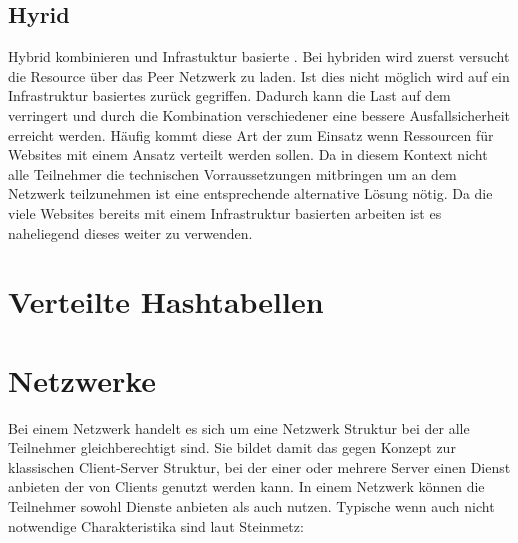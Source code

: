 \subsection{Hyrid \cdns}
Hybrid \cdns kombinieren \pTp \cdns und Infrastuktur basierte \cdns. Bei hybriden \cdns wird zuerst versucht die Resource über das Peer Netzwerk zu laden. Ist dies nicht möglich wird auf ein Infrastruktur basiertes \cdn zurück gegriffen. Dadurch kann die Last auf dem \cdn verringert und durch die Kombination verschiedener \cdns eine bessere Ausfallsicherheit erreicht werden. Häufig kommt diese Art der \cdns zum Einsatz wenn Ressourcen für Websites mit einem \pTp Ansatz verteilt werden sollen. Da in diesem Kontext nicht alle Teilnehmer die technischen Vorraussetzungen mitbringen um an dem \pTp Netzwerk teilzunehmen ist eine entsprechende alternative Lösung nötig. Da die viele Websites bereits mit einem Infrastruktur basierten \cdn arbeiten ist es naheliegend dieses weiter zu verwenden.
\section{Verteilte Hashtabellen}

\section{\pTp Netzwerke}
Bei einem \pTp Netzwerk handelt es sich um eine Netzwerk Struktur bei der alle Teilnehmer gleichberechtigt sind. Sie bildet damit das gegen Konzept zur klassischen Client-Server Struktur, bei der einer oder mehrere Server einen Dienst anbieten der von Clients genutzt werden kann. In einem \pTp Netzwerk können die Teilnehmer sowohl Dienste anbieten als auch nutzen. Typische wenn auch nicht notwendige Charakteristika sind laut Steinmetz\cite{p2pBook2005}:

